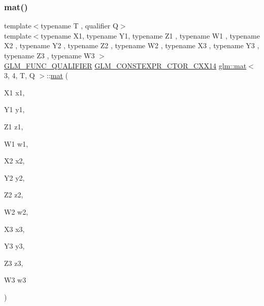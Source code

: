 \subsubsection{\texorpdfstring{mat()}{mat()}\hspace{0.1cm}{\footnotesize\ttfamily [19/21]}}
{\footnotesize\ttfamily template$<$typename T , qualifier Q$>$ \\
template$<$typename X1, typename Y1, typename Z1 , typename W1 , typename X2 , typename Y2 , typename Z2 , typename W2 , typename X3 , typename Y3 , typename Z3 , typename W3 $>$ \\
\hyperlink{setup_8hpp_a33fdea6f91c5f834105f7415e2a64407}{G\+L\+M\+\_\+\+F\+U\+N\+C\+\_\+\+Q\+U\+A\+L\+I\+F\+I\+ER} \hyperlink{setup_8hpp_a0900f9145e68bf6061b6f5e7be3fa751}{G\+L\+M\+\_\+\+C\+O\+N\+S\+T\+E\+X\+P\+R\+\_\+\+C\+T\+O\+R\+\_\+\+C\+X\+X14} \hyperlink{structglm_1_1mat}{glm\+::mat}$<$ 3, 4, T, Q $>$\+::\hyperlink{structglm_1_1mat}{mat} (\begin{DoxyParamCaption}\item[{X1}]{x1,  }\item[{Y1}]{y1,  }\item[{Z1}]{z1,  }\item[{W1}]{w1,  }\item[{X2}]{x2,  }\item[{Y2}]{y2,  }\item[{Z2}]{z2,  }\item[{W2}]{w2,  }\item[{X3}]{x3,  }\item[{Y3}]{y3,  }\item[{Z3}]{z3,  }\item[{W3}]{w3 }\end{DoxyParamCaption})}

\mbox{\label{structglm_1_1mat_3_013_00_014_00_01_t_00_01_q_01_4_ac2826bfed2065c9ecd22ac59bd41488b}} 

